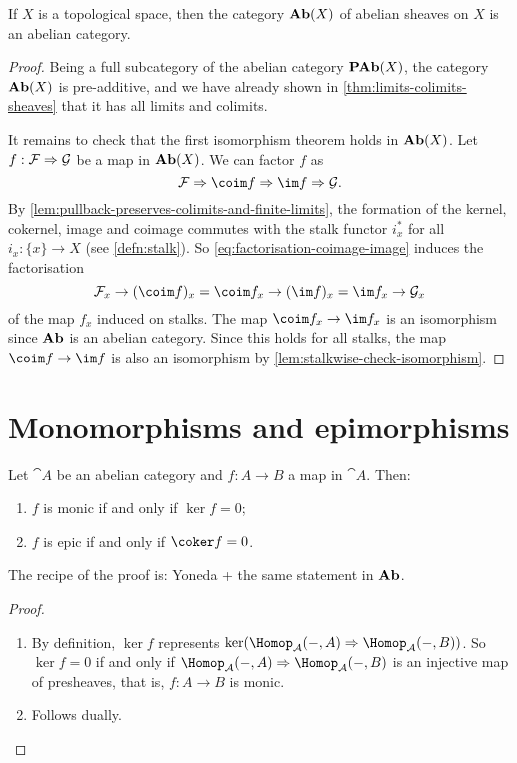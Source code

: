 \begin{prop}
If \(X\) is a topological space, then the category \(\operatorname{\mathbf{Ab}}(X)\) of abelian sheaves on \(X\) is an abelian category.
\end{prop}
\begin{proof}
Being a full subcategory of the abelian category \(\operatorname{\mathbf{PAb}}(X)\), the category \(\operatorname{\mathbf{Ab}}(X)\) is pre-additive, and we have already shown in \cref{thm:limits-colimits-sheaves} that it has all limits and colimits.

It remains to check that the first isomorphism theorem holds in \(\operatorname{\mathbf{Ab}}(X)\).
Let \(f\colon\mathcal F\To\mathcal G\) be a map in \(\operatorname{\mathbf{Ab}}(X)\).
We can factor \(f\) as
\begin{equation}\label{eq:factorisation-coimage-image}
  \mathcal F \To \coim f \To \im f \To \mathcal G\text{.}
\end{equation}
By \cref{lem:pullback-preserves-colimits-and-finite-limits}, the formation of the kernel, cokernel, image and coimage commutes with the stalk functor \(i_x^*\) for all \(i_x\colon\{x\}\to X\) (see \cref{defn:stalk}).
So \cref{eq:factorisation-coimage-image} induces the factorisation
\[ \mathcal F_x \to (\coim f)_x = \coim f_x \to (\im f)_x = \im f_x \to \mathcal G_x \]
of the map \(f_x\) induced on stalks.
The map \(\coim f_x\to\im f_x\) is an isomorphism since \(\mathbf{Ab}\) is an abelian category.
Since this holds for all stalks, the map \(\coim f\to\im f\) is also an isomorphism by \cref{lem:stalkwise-check-isomorphism}.
\end{proof}

\section{Monomorphisms and epimorphisms}

\begin{lem}
Let \(\cat A\) be an abelian category and \(f\colon A\to B\) a map in \(\cat A\).
Then:
\begin{enumerate}
\item \(f\) is monic if and only if \(\ker f = 0\);
\item \(f\) is epic if and only if \(\coker f = 0\).
\end{enumerate}
\end{lem}

The recipe of the proof is: Yoneda + the same statement in \(\mathbf{Ab}\).

\begin{proof}
\begin{enumerate}
\item
  By definition, \(\ker f\) represents \(\ker(\Hom[\cat A](-,A)\To\Hom[\cat A](-,B))\).
  So \(\ker f = 0\) if and only if \(\Hom[\cat A](-,A)\To\Hom[\cat A](-,B)\) is an injective map of presheaves, that is, \(f\colon A\to B\) is monic.
\item Follows dually. \qedhere
\end{enumerate}
\end{proof}

